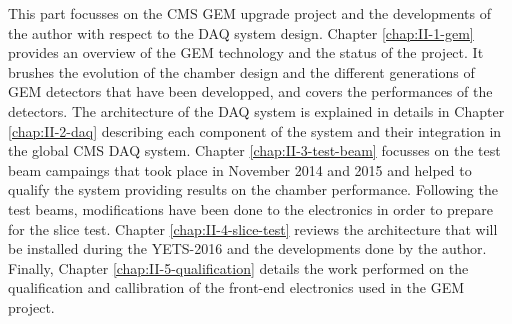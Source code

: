 This part focusses on the CMS GEM upgrade project and the developments of the author with respect to the DAQ system design. Chapter \ref{chap:II-1-gem} provides an overview of the GEM technology and the status of the project. It brushes the evolution of the chamber design and the different generations of GEM detectors that have been developped, and covers the performances of the detectors. The architecture of the DAQ system is explained in details in Chapter \ref{chap:II-2-daq} describing each component of the system and their integration in the global CMS DAQ system. Chapter \ref{chap:II-3-test-beam} focusses on the test beam campaings that took place in November 2014 and 2015 and helped to qualify the system providing results on the chamber performance. Following the test beams, modifications have been done to the electronics in order to prepare for the slice test. Chapter \ref{chap:II-4-slice-test} reviews the architecture that will be installed during the YETS-2016 and the developments done by the author. Finally, Chapter \ref{chap:II-5-qualification} details the work performed on the qualification and callibration of the front-end electronics used in the GEM project.
